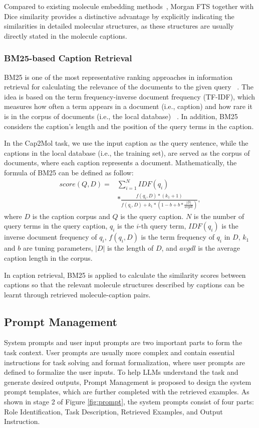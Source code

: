 \documentclass{article}
\theoremstyle{plain}
\theoremstyle{definition}
\theoremstyle{remark}
\begin{document}
Compared to existing molecule embedding methods~\cite{coupry2022application}, Morgan FTS together with Dice similarity provides a distinctive advantage by explicitly indicating the similarities in detailed molecular structures, as these structures are usually directly stated in the molecule captions.



\subsubsection{BM25-based Caption Retrieval} 
BM25 is one of the most representative ranking approaches in information retrieval for calculating the relevance of the documents to the given query ~\cite{robertson2009probabilistic}. 
The idea is based on the term frequency-inverse document frequency (TF-IDF), which measures how often a term appears in a document (i.e., caption) and how rare it is in the corpus of documents (i.e., the local database) ~\cite{aizawa2003information}. In addition, BM25 considers the caption's length and the position of the query terms in the caption.

In the Cap2Mol task, we use the input caption as the query sentence, while the captions in the local database (i.e., the training set), are served as the corpus of documents, where each caption represents a document.
Mathematically, the formula of BM25 can be defined as follow:
\begin{align}
    score(Q,D) = &\sum_{i=1}^N IDF(q_i) \nonumber \\
    &*\frac{f(q_i,D)*(k_1+1)}{f(q_i,D)+k_1*(1-b+b*\frac{|D|}{avgdl})},
\end{align}
where $D$ is the caption corpus and $Q$ is the query caption. $N$ is the number of query terms in the query caption, $q_i$ is the $i$-th query term, $IDF(q_i)$ is the inverse document frequency of $q_i$, $f(q_i, D)$ is the term frequency of $q_i$ in $D$, $k_1$ and $b$ are tuning parameters, $|D|$ is the length of $D$, and $avgdl$ is the average caption length in the corpus.

In caption retrieval, BM25 is applied to calculate the similarity scores between captions so that the relevant molecule structures described by captions can be learnt through retrieved molecule-caption pairs.


\subsection{Prompt Management}
System prompts and user input prompts are two important parts to form the task context. User prompts are usually more complex and contain essential instructions for task solving and format formalization, where user prompts are defined to formalize the user inputs. To help LLMs understand the task and generate desired outputs, Prompt Management is proposed to design the system prompt templates, which are further completed with the retrieved examples. 
As shown in stage 2 of Figure \ref{fig:prompt}, the system prompts consist of four parts: Role Identification, Task Description, Retrieved Examples, and Output Instruction.
\end{document}
